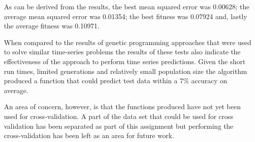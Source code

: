 As can be derived from the results, the best mean squared error was 0.00628; the average mean squared error was 0.01354; the best fitness was 0.07924 and, lastly the average fitness was 0.10971.

When compared to the results of genetic programming approaches that were used to solve similar time-series problems \cite{hui2003using, de2005genetic} the results of these tests also indicate the effectiveness of the approach to perform time series predictions. Given the short run times, limited generations and relatively small population size the algorithm produced a function that could predict test data within a 7\% accuracy on average. 

An area of concern, however, is that the functions produced have not yet been used for cross-validation. A part of the data set that could be used for cross validation has been separated as part of this assignment but performing the cross-validation has been left as an area for future work.


